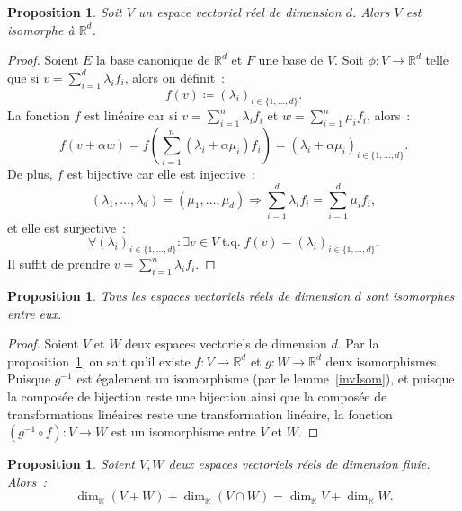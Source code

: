 \documentclass{article}
\DeclareMathOperator{\tq}{\text{ t.q. }}
\newcommand{\R}{\mathbb R}
\newtheorem{prp}[thm]{Proposition}
\theoremstyle{definition}
\theoremstyle{remark}
\begin{document}
		\begin{prp}\label{dimDIsomorpheRd} Soit $V$ un espace vectoriel réel de dimension $d$. Alors $V$ est isomorphe à $\R^d$. \end{prp}

		\begin{proof} Soient $E$ la base canonique de $\R^d$ et $F$ une base de $V$. Soit $\phi : V \to \R^d$ telle que si $v = \sum_{i=1}^d\lambda_if_i$, alors on
		définit~: \[f(v) \coloneqq (\lambda_i)_{i \in \{1, \dotsc, d\}}.\] La fonction $f$ est linéaire car si
		$v = \sum_{i=1}^n\lambda_if_i$ et $w = \sum_{i=1}^n\mu_if_i$, alors~:
		\[f(v + \alpha w) = f\left(\sum_{i=1}^n(\lambda_i + \alpha\mu_i)f_i\right) = (\lambda_i + \alpha\mu_i)_{i \in \{1, \dotsc, d\}}.\]
		De plus, $f$ est bijective car elle est injective~:
		\[(\lambda_1, \dotsc, \lambda_d) = (\mu_1, \dotsc, \mu_d) \Rightarrow \sum_{i=1}^d\lambda_if_i = \sum_{i=1}^d\mu_if_i,\]
		et elle est surjective~:
		\[\forall (\lambda_i)_{i \in \{1, \dotsc, d\}} : \exists v \in V \tq f(v) = (\lambda_i)_{i \in \{1, \dotsc, d\}}.\]
		Il suffit de prendre $v = \sum_{i=1}^n\lambda_if_i$. \end{proof}

		\begin{prp}\label{dimDIso} Tous les espaces vectoriels réels de dimension $d$ sont isomorphes entre eux. \end{prp}
		
		\begin{proof} Soient $V$ et $W$ deux espaces vectoriels de dimension $d$. Par la proposition~\ref{dimDIsomorpheRd}, on sait qu'il existe $f : V \to \R^d$
		et $g : W \to \R^d$ deux isomorphismes. Puisque $g^{-1}$ est également un isomorphisme (par le lemme~\ref{invIsom}), et puisque la composée de bijection reste
		une bijection ainsi que la composée de transformations linéaires reste une transformation linéaire, la fonction $(g^{-1} \circ f) : V \to W$ est un isomorphisme
		entre $V$ et $W$. \end{proof}

		\begin{prp} Soient $V, W$ deux espaces vectoriels réels de dimension finie. Alors~: \[\dim_\R(V+W) + \dim_\R(V \cap W) = \dim_\R V + \dim_\R W.\] \end{prp}
\end{document}
